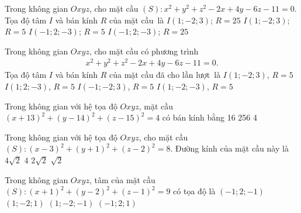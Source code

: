 \begin{ex}%
	Trong không gian $Oxyz$, cho mặt cầu $(S)\colon x^2+y^2+z^2-2x+4y-6z-11=0$. Tọa độ tâm $I$  và bán kính $R$ của mặt cầu~là
	\choice 
		{$I(1;-2;3)$;  $R=25$}
		{\True  $I(1;-2;3)$; $R=5$}
		{$I(-1;2;-3)$; $R=5$} 
		{$I(-1;2;-3)$;  $R=25$}
\end{ex}

\begin{ex}%
	 Trong không gian $Oxyz$, cho mặt cầu có phương trình
	\begin{align*}
		x^2 +y^2 +z^2  -2x +4y -6z-11=0.
	\end{align*}
	Tọa độ tâm  $I$ và bán kính $R$ của mặt cầu đã cho lần lượt~là
	\choice 
		{\True $I(1;-2;3)$,  $R=5$}
		 {$I(1;2;-3)$, $R=5$}
		{$I(-1;-2;3)$, $R=5$} 
		{$I(1;-2;-3)$, $R=5$} 
\end{ex}

\begin{ex}%
	Trong không gian với hệ tọa  độ $Oxyz$, mặt cầu $(x+13)^2+(y-14)^2+(z-15)^2=4$ có bán kính bằng
	\choice 
		 {16}
		{} 
		 {256}
		{4} 
\end{ex}

\begin{ex}%
	Trong không gian với hệ tọa độ $Oxyz$, cho mặt cầu $(S)\colon (x-3)^2 + (y+1)^2 + (z-2)^2 = 8$. Đường kính của  mặt cầu này là
	\choice 
		 {\True $4\sqrt{2}$}
		{$4$} 
		{$2\sqrt{2}$} 
		 {$\sqrt{2}$}
\end{ex}

\begin{ex}%
	Trong không gian $Oxyz$, tâm của mặt  cầu $(S)\colon (x+1)^2+(y-2)^2+(z-1)^2=9$ có tọa độ là
	\choice 
		{$(-1;  2;-1)$}
		{$(1;-2;  1)$}
		{$(1;-2;-1)$} 
		{\True $(-1; 2; 1)$} 
\end{ex}

